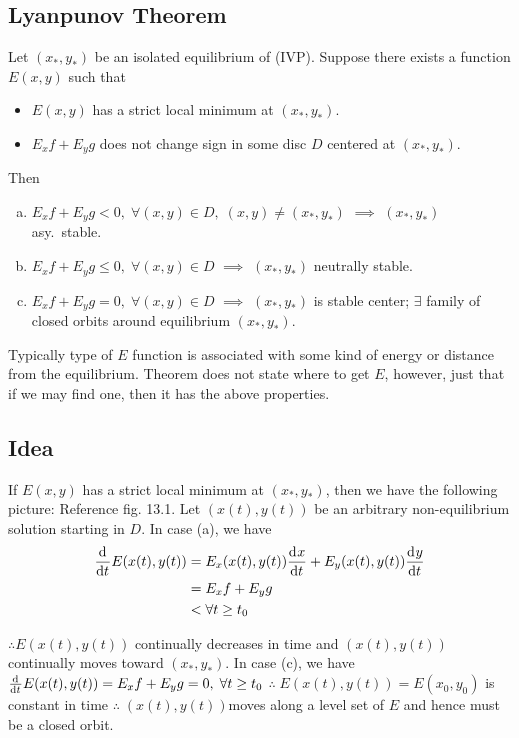 \documentclass[12pt]{article}
\begin{document}
\subsection{Lyanpunov Theorem}
Let $(x_*,y_*)$ be an isolated equilibrium of (IVP). Suppose there exists a
function $E(x,y)$ such that
\begin{itemize}
\item $E(x,y)$ has a strict local minimum at $(x_*,y_*)$.
\item $E_x f + E_y g$ does not change sign in some disc $D$ centered at $(x_*,y_*)$.
\end{itemize}
Then
\begin{enumerate}[(a)]
\item $E_x f + E_y g<0,\;\forall(x,y)\in D,\;(x,y)\ne(x_*,y_*)$ $\implies$
  $(x_*,y_*)$ asy.\ stable.
\item $E_x f + E_y g\le0,\;\forall(x,y)\in D$ $\implies$ $(x_*,y_*)$ neutrally
  stable.
\item $E_x f + E_y g=0,\;\forall(x,y)\in D$ $\implies$ $(x_*,y_*)$ is stable center;
  $\exists$ family of closed orbits around equilibrium $(x_*,y_*)$.
\end{enumerate}
Typically type of $E$ function is associated with some kind of energy or
distance from the equilibrium. Theorem does not state where to get $E$, however,
just that if we may find one, then it has the above properties.

\subsection{Idea}
If $E(x,y)$ has a strict local minimum at $(x_*,y_*)$, then we have the
following picture: Reference fig. 13.1. Let $(x(t), y(t))$ be an arbitrary
non-equilibrium solution starting in $D$. In case (a), we have
\begin{equation}
  \begin{aligned}
    \frac{\mathrm{d}^{} {}}{\mathrm{d}{t}^{}}E(x(t),y(t))&=E_x(x(t),y(t))\frac{\mathrm{d}^{} {x}}{\mathrm{d}{t}^{}}+E_y(x(t),y(t))\frac{\mathrm{d}^{} {y}}{\mathrm{d}{t}^{}} \\
    &= E_x f + E_y g \\
    &<\forall t\ge t_0
  \end{aligned}
\end{equation}

$\therefore E(x(t),y(t))$ continually decreases in time and $(x(t),y(t))$
continually moves toward $(x_*,y_*)$. In case (c), we have
$\frac{\mathrm{d}^{} {}}{\mathrm{d}{t}^{}}E(x(t),y(t))=E_x f + E_y g=0,\;\forall t\ge t_0$
$\therefore\;E(x(t),y(t)) = E(x_0,y_0)$ is constant in time
$\therefore\;(x(t),y(t))$moves along a level set of $E$ and hence must be a
closed orbit.
\end{document}
